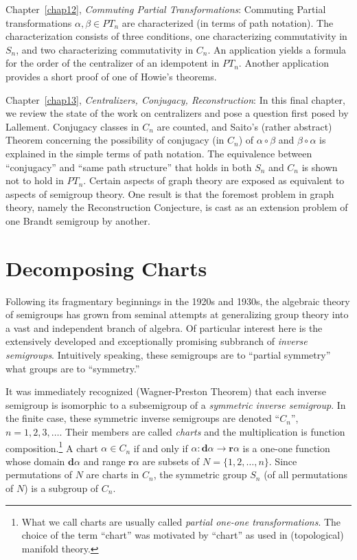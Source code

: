 \documentclass{surv-l}
\numberwithin{equation}{section}
\numberwithin{table}{section}
\numberwithin{figure}{section}
\theoremstyle{plain}
\theoremstyle{definition}
\begin{document}
Chapter~\ref{chap12}, \emph{Commuting Partial Transformations}:
Commuting Partial transformations $\alpha,\beta\in PT_{n}$ are
characterized (in terms of path notation). The characterization
consists of three conditions, one characterizing commutativity in
$S_{n}$, and two characterizing commutativity in $C_{n}$. An
application yields a formula for the order of the centralizer of
an idempotent in $PT_{n}$. Another application provides a short
proof of one of Howie's theorems.

Chapter~\ref{chap13}, \emph{Centralizers, Conjugacy,
Reconstruction}: In this final chapter, we review the state of the
work on centralizers and pose a question first posed by Lallement.
Conjugacy classes in $C_{n}$ are counted, and Saito's (rather
abstract) Theorem concerning the possibility of conjugacy (in
$C_{n}$) of $\alpha \circ \beta$ and $\beta \circ\alpha$ is
explained in the simple terms of path notation. The equivalence
between ``conjugacy'' and ``same path structure'' that holds in
both $S_{n}$ and $C_{n}$ is shown not to hold in $PT_{n}$. Certain
aspects of graph theory are exposed as equivalent to aspects of
semigroup theory. One result is that the foremost problem in graph
theory, namely the Reconstruction Conjecture, is cast as an
extension problem of one Brandt semigroup by another.

\chapter{Decomposing Charts}\label{chap1}

Following its fragmentary beginnings in the 1920s and 1930s, the
algebraic theory of semigroups has grown from seminal attempts at
generalizing group theory into a vast and independent branch of
algebra. Of particular interest here is the extensively developed
and exceptionally promising subbranch of \emph{inverse
semigroups}. Intuitively speaking, these
semigroups are to ``partial symmetry'' what groups are to ``symmetry.''

It was immediately recognized (Wagner-Preston Theorem) that each
inverse semigroup is isomorphic to a subsemigroup of a
\emph{symmetric inverse semigroup}. In the finite case, these
symmetric inverse semigroups are denoted ``$C_{n}$'',
$n=1,2,3,\ldots.$ Their members are called
\emph{charts} and the multiplication is function
composition.\footnote{What we call charts are usually called
\emph{partial one-one transformations}. The choice of the term
``chart'' was motivated by ``chart'' as used in (topological)
manifold theory.} A chart $\alpha\in C_{n}$ if and only if $\alpha
: \mathbf{d}\alpha\rightarrow \mathbf{r}\alpha$ is a one-one
function whose domain $\mathbf{d}\alpha$ and range
$\mathbf{r}\alpha$ are subsets of $N=\{1,2,\ldots, n\}$. Since
permutations of $N$ are charts in $C_{n}$, the symmetric group
$S_{n}$ (of all permutations of $N$) is a subgroup of $C_{n}$.
\end{document}
